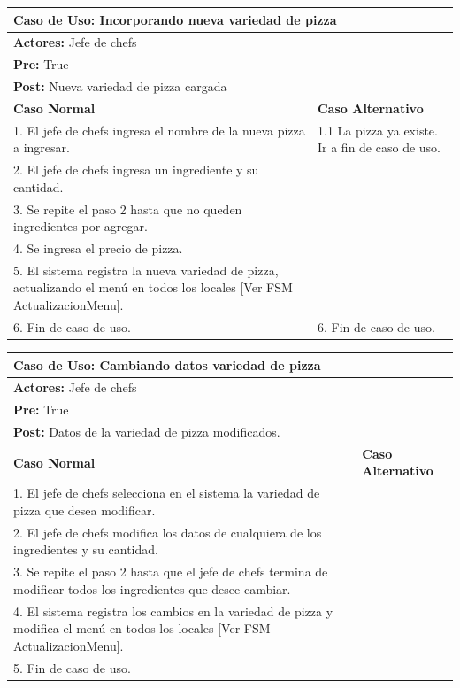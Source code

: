\documentclass[a4paper,11pt] {article}
\begin{document}
\begin{center}
	\begin{tabular}{ | p{6.5cm} | p{6.5cm} | }
		\hline
			\multicolumn{2}{|l|}{\textbf{Caso de Uso:} Incorporando nueva variedad de pizza} \\
		\hline
			\multicolumn{2}{|l|}{\textbf{Actores:} Jefe de chefs} \\
		\hline
			\multicolumn{2}{|l|}{\textbf{Pre:} True} \\
		\hline
			\multicolumn{2}{|l|}{\textbf{Post:} Nueva variedad de pizza cargada} \\
		\hline
		\textbf{Caso Normal} & \textbf{Caso Alternativo}	\\
		\hline
		1. El jefe de chefs ingresa el nombre de la nueva pizza a ingresar. & 1.1 La pizza ya existe. Ir a fin de caso de uso.	\\
		\hline
		2. El jefe de chefs ingresa un ingrediente y su cantidad. &	\\
		\hline
		3. Se repite el paso 2 hasta que no queden ingredientes por agregar. &	\\
		\hline
		4. Se ingresa el precio de pizza. &	\\
		\hline
		5. El sistema registra la nueva variedad de pizza, actualizando el men\'u en todos los locales [Ver FSM ActualizacionMenu]. &	\\
		\hline
		6. Fin de caso de uso. & 6. Fin de caso de uso.	\\
		\hline
	\end{tabular}
\end{center}

\begin{center}
	\begin{tabular}{ | p{6.5cm} | p{6.5cm} | }
		\hline
			\multicolumn{2}{|l|}{\textbf{Caso de Uso:} Cambiando datos variedad de pizza} \\
		\hline
			\multicolumn{2}{|l|}{\textbf{Actores:} Jefe de chefs} \\
		\hline
			\multicolumn{2}{|l|}{\textbf{Pre:} True} \\
		\hline
			\multicolumn{2}{|l|}{\textbf{Post:} Datos de la variedad de pizza modificados.} \\
		\hline
		\textbf{Caso Normal} & \textbf{Caso Alternativo}	\\
		\hline
		1. El jefe de chefs selecciona en el sistema la variedad de pizza que desea modificar. & 	\\
		\hline
		2. El jefe de chefs modifica los datos de cualquiera de los ingredientes y su cantidad.  &	\\
		\hline
		3. Se repite el paso 2 hasta que el jefe de chefs termina de modificar todos los ingredientes que desee cambiar. &	\\
		\hline
		4. El sistema registra los cambios en la variedad de pizza y modifica el men\'u en todos los locales [Ver FSM ActualizacionMenu].  &	\\
		\hline
		5. Fin de caso de uso. &	\\
		\hline
	\end{tabular}
\end{center}
\end{document}
